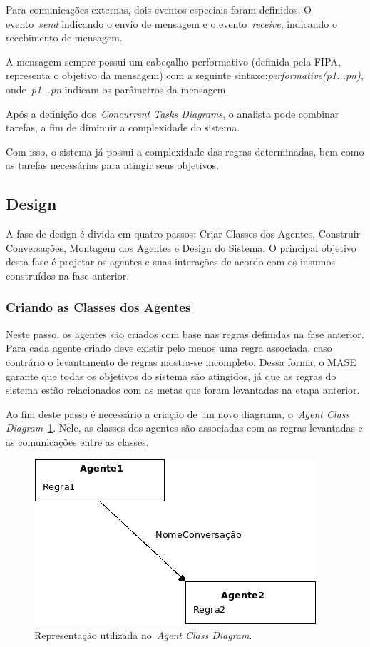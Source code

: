 Para comunicações externas, dois eventos especiais foram definidos: O evento~\emph{send} indicando o envio de mensagem e o evento~\emph{receive}, indicando o recebimento de mensagem.

A mensagem sempre possui um cabeçalho performativo (definida pela FIPA, representa o objetivo da mensagem) com a seguinte sintaxe:\emph{performative(p1...pn)}, onde~\emph{p1...pn} indicam os parâmetros da mensagem.

Após a definição dos~\emph{Concurrent Tasks Diagrams}, o analista pode combinar tarefas, a fim de diminuir a complexidade do sistema. 

Com isso, o sistema já possui a complexidade das regras determinadas, bem como as tarefas necessárias para atingir seus objetivos.

\subsection{Design}

A fase de design é divida em quatro passos: Criar Classes dos Agentes, Construir Conversações, Montagem dos Agentes e Design do Sistema. O principal objetivo desta fase é projetar os agentes e suas interações de acordo com os insumos construídos na fase anterior.

\subsubsection{Criando as Classes dos Agentes}

Neste passo, os agentes são criados com base nas regras definidas na fase anterior. Para cada agente criado deve existir pelo menos uma regra associada, caso contrário o levantamento de regras mostra-se incompleto. Dessa forma, o MASE garante que todas os objetivos  do sistema são atingidos, já que as regras do sistema estão relacionados com as metas que foram levantadas na etapa anterior.

Ao fim deste passo é necessário a criação de um novo diagrama, o~\emph{Agent Class Diagram}~\ref{fig:exemplo-agent-class-diagram}. Nele, as classes dos agentes são associadas com as regras levantadas e as comunicações entre as classes.

\begin{figure}
	\centering
	\includegraphics[scale=0.65]{images/exemplo-agent-class-diagram.png}
	\caption{Representação utilizada no~\emph{Agent Class Diagram}.}
	\label{fig:exemplo-agent-class-diagram}
\end{figure}

